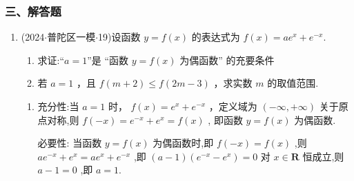 \subsubsection*{三、解答题}
\begin{enumerate}
    \item (2024$\cdot$普陀区一模$\cdot$19)设函数 $y = f\left( x\right)$ 的表达式为 $f\left( x\right)  = a{{e}}^{x} + {{e}}^{-x}$.
    \begin{enumerate}
        \item 求证:“$a = 1$”是 “函数 $y = f\left( x\right)$ 为偶函数” 的充要条件
        \item 若 $a = 1$ ，且 $f\left( {m + 2}\right)  \leq  f\left( {{2m} - 3}\right)$ ，求实数 $m$ 的取值范围.
    \end{enumerate}
    \begin{jieda}
        \begin{enumerate}
            \item 充分性:当 $a = 1$ 时， $f\left( x\right)  = {{e}}^{x} + {{e}}^{-x}$ ，定义域为 $\left( {-\infty , + \infty }\right)$ 关于原点对称,则 $f\left( {-x}\right)  = {{e}}^{-x} + {{e}}^{x} = f\left( x\right)$ , 即函数 $y = f\left( x\right)$ 为偶函数. 
            
            必要性: 当函数 $y = f\left( x\right)$ 为偶函数时,即 $f\left( {-x}\right)  = f\left( x\right)$ ,则 $a{{e}}^{-x} + {{e}}^{x} = a{{e}}^{x} + {{e}}^{-x}$ ,即 $\left( {a - 1}\right) \left( {{{e}}^{-x} - {{e}}^{x}}\right)  = 0$ 对 $x \in  \mathbf{R}$ 恒成立,则 $a - 1 = 0$ ,即 $a = 1$. 
            

\end{enumerate}
\end{jieda}
\end{enumerate}
